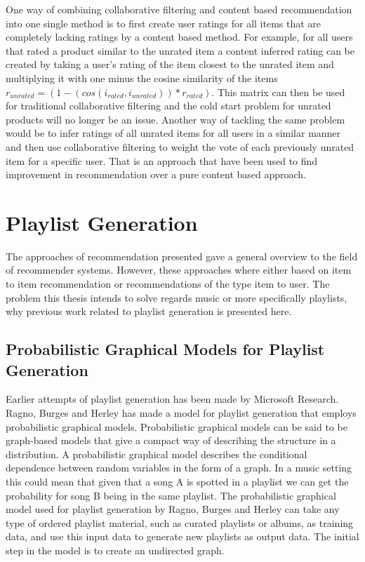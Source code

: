 \documentclass[a4paper,11pt]{kth-mag}
\begin{document}
One way of combining collaborative filtering and content based recommendation into one single method is to first create user ratings for all items that are completely lacking ratings by a content based method. For example, for all users that rated a product similar to the unrated item a content inferred rating can be created by taking a user's rating of the item closest to the unrated item and multiplying it with one minus the cosine similarity of the items $r_{unrated}  = (1 - (cos(i_{rated},i_{unrated})) * r_{rated})$. This matrix can then be used for traditional collaborative filtering and the cold start problem for unrated products will no longer be an issue. Another way of tackling the same problem would be to infer ratings of all unrated items for all users in a similar manner and then use collaborative filtering to weight the vote of each previously unrated item for a specific user. That is an approach that have been used to find improvement in recommendation over a pure content based approach\cite{melville2002content}.
\section{Playlist Generation}
The approaches of recommendation presented gave a general overview to the field of recommender systems. However, these approaches where either based on item to item recommendation or recommendations of the type item to user. The problem this thesis intends to solve regards music or more specifically playlists, why previous work related to playlist generation is presented here. 

\subsection{Probabilistic Graphical Models for Playlist Generation}
Earlier attempts of playlist generation has been made by Microsoft Research\cite{ragno2005inferring}. Ragno, Burges and Herley has made a model for playlist generation that employs probabilistic graphical models. Probabilistic graphical models can be said to be graph-based models that give a compact way of describing the structure in a distribution. A probabilistic graphical model describes the conditional dependence between random variables in the form of a graph\cite{koller2009probabilistic}. In a music setting this could mean that given that a song A is spotted in a playlist we can get the probability for song B being in the same playlist. The probabilistic graphical model used for playlist generation by Ragno, Burges and Herley can take any type of ordered playlist material, such as curated playlists or albums, as training data, and use this input data to generate new playlists as output data. The initial step in the model is to create an undirected graph. 
\end{document}
